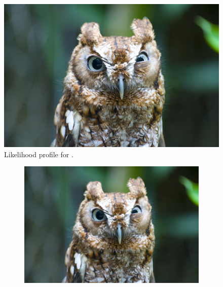 {\begin{figure}[htbp]
    \centering
        \includegraphics[width= 0.6 \textwidth]{./Figs/placeholder.jpeg}  
    \caption{Likelihood profile for \tmumu.}
    \label{fig:taulike}
\end{figure}

\begin{figure}[htbp]
    \centering
   \begin{subfigure}[b]{0.48\textwidth}
        \includegraphics[width= \textwidth]{./Figs/placeholder.jpeg}
    \end{subfigure}
   ~ %
    \begin{subfigure}[b]{0.48\textwidth}

\end{subfigure}
\end{figure}}

